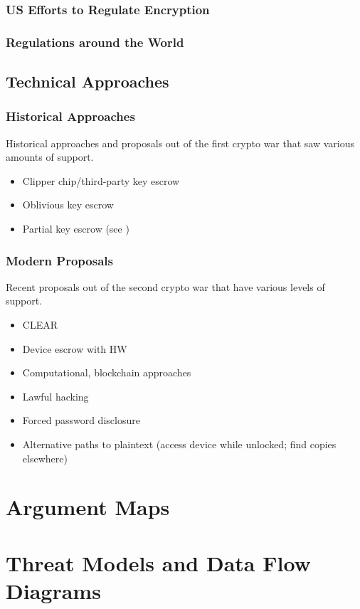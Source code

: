 \subsubsection*{US Efforts to Regulate Encryption}

\subsubsection*{Regulations around the World}

\subsection{Technical Approaches}
\label{sec-tech-approaches}

\subsubsection*{Historical Approaches}

Historical approaches and proposals out of the first crypto war that saw various amounts of support.

\begin{itemize}
    \item Clipper chip/third-party key escrow \cite{blaze_protocol_1994}
    \item Oblivious key escrow \cite{goos_oblivious_1996}
    \item Partial key escrow (see \cite{denning_taxonomy_1996})
\end{itemize}

\subsubsection*{Modern Proposals}

Recent proposals out of the second crypto war that have various levels of support.

\begin{itemize}
    \item CLEAR \cite{ozzie_2018}
    \item Device escrow with HW \cite{savage_lawful_2018}
    \item Computational, blockchain approaches \cite{phan_key_2017}
    \item Lawful hacking \cite{nguyen_lawful_2017} \cite{soesanto_2018} \cite{kerr_encryption_2017}
    \item Forced password disclosure \cite{bittenbender_2019} \cite{kerr_encryption_2017}
    \item Alternative paths to plaintext (access device while unlocked; find copies elsewhere)
        \cite{kerr_encryption_2017}
\end{itemize}

\section{Argument Maps}
\label{sec-arg-maps-intro}

\section{Threat Models and Data Flow Diagrams}
\label{sec-threat-model-intro}
